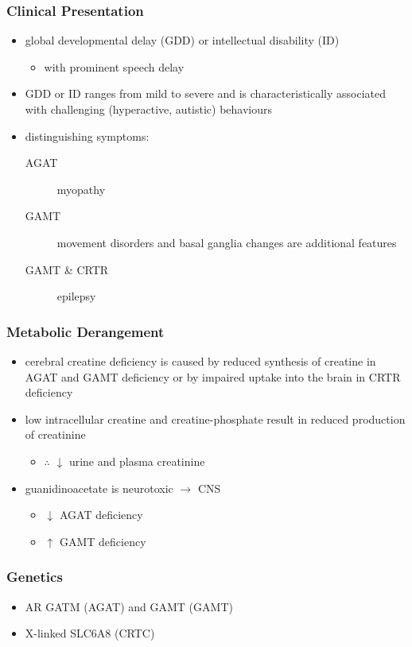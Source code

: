 \documentclass[12pt]{scrartcl}
\begin{document}
\subsubsection{Clinical Presentation}
\label{sec:org3aca249}
\begin{itemize}
\item global developmental delay (GDD) or intellectual disability (ID)
\begin{itemize}
\item with prominent speech delay
\end{itemize}
\item GDD or ID ranges from mild to severe and is characteristically
associated with challenging (hyperactive, autistic) behaviours
\item distinguishing symptoms:
\begin{description}
\item[{AGAT}] myopathy
\item[{GAMT}] movement disorders and basal ganglia changes are
additional features
\item[{GAMT \& CRTR}] epilepsy
\end{description}
\end{itemize}

\subsubsection{Metabolic Derangement}
\label{sec:org3df0a49}
\begin{itemize}
\item cerebral creatine deficiency is caused by reduced synthesis of
creatine in AGAT and GAMT deficiency or by impaired uptake into the
brain in CRTR deficiency
\item low intracellular creatine and creatine-phosphate result in reduced
production of creatinine
\begin{itemize}
\item \(\therefore\) \(\downarrow\) urine and plasma creatinine
\end{itemize}
\item guanidinoacetate is neurotoxic \(\to\) CNS
\begin{itemize}
\item \(\downarrow\) AGAT deficiency
\item \(\uparrow\) GAMT deficiency
\end{itemize}
\end{itemize}

\subsubsection{Genetics}
\label{sec:org0e115ff}
\begin{itemize}
\item AR GATM (AGAT)  and GAMT (GAMT)
\item X-linked SLC6A8 (CRTC)
\end{itemize}
\end{document}

